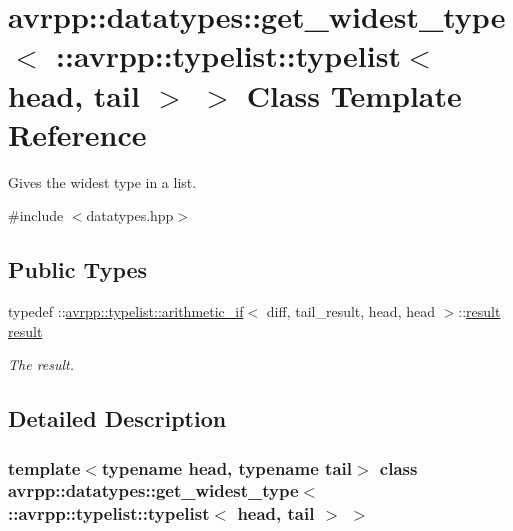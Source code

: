 \hypertarget{classavrpp_1_1datatypes_1_1get__widest__type_3_01_1_1avrpp_1_1typelist_1_1typelist_3_01head_00_01tail_01_4_01_4}{
\section{avrpp::datatypes::get\_\-widest\_\-type$<$ ::avrpp::typelist::typelist$<$ head, tail $>$ $>$ Class Template Reference}
\label{classavrpp_1_1datatypes_1_1get__widest__type_3_01_1_1avrpp_1_1typelist_1_1typelist_3_01head_00_01tail_01_4_01_4}
}


Gives the widest type in a list.  




{\ttfamily \#include $<$datatypes.hpp$>$}

\subsection*{Public Types}
\begin{DoxyCompactItemize}
\item 
typedef ::\hyperlink{classavrpp_1_1typelist_1_1arithmetic__if}{avrpp::typelist::arithmetic\_\-if}$<$ diff, tail\_\-result, head, head $>$::\hyperlink{classavrpp_1_1datatypes_1_1get__widest__type_3_01_1_1avrpp_1_1typelist_1_1typelist_3_01head_00_01tail_01_4_01_4_a5708e104ae249b01ecdbe071cf8ec231}{result} \hyperlink{classavrpp_1_1datatypes_1_1get__widest__type_3_01_1_1avrpp_1_1typelist_1_1typelist_3_01head_00_01tail_01_4_01_4_a5708e104ae249b01ecdbe071cf8ec231}{result}
\begin{DoxyCompactList}\small\item\em The result. \item\end{DoxyCompactList}\end{DoxyCompactItemize}


\subsection{Detailed Description}
\subsubsection*{template$<$typename head, typename tail$>$ class avrpp::datatypes::get\_\-widest\_\-type$<$ ::avrpp::typelist::typelist$<$ head, tail $>$ $>$}

